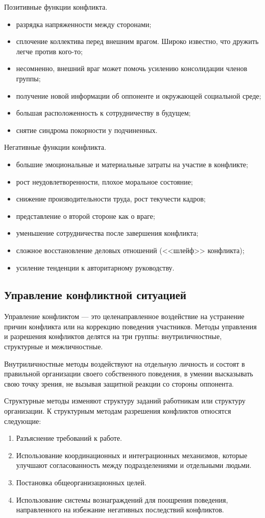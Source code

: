 \documentclass[a4paper,12pt,oneside,final]{extarticle}
\numberwithin{equation}{section}
\begin{document}
Позитивные функции конфликта.
\begin{itemize}
	\item разрядка напряженности между сторонами;
	\item сплочение коллектива перед внешним врагом. Широко известно, что дружить легче против кого-то;
	\item несомненно, внешний враг может помочь усилению консолидации членов группы;
	\item получение новой информации об оппоненте и окружающей социальной среде;
	\item большая расположенность к сотрудничеству в будущем;
	\item снятие синдрома покорности у подчиненных.
\end{itemize}

Негативные функции конфликта.
\begin{itemize}
	\item большие эмоциональные и материальные затраты на участие в конфликте;
	\item рост неудовлетворенности, плохое моральное состояние;
	\item снижение производительности труда, рост текучести кадров;
	\item представление о второй стороне как о враге;
	\item уменьшение сотрудничества после завершения конфликта;
	\item сложное восстановление деловых отношений (<<шлейф>> конфликта);
	\item усиление тенденции к авторитарному руководству.
\end{itemize}

\subsection{Управление конфликтной ситуацией}
Управление конфликтом --- это целенаправленное воздействие на устранение причин конфликта или на коррекцию поведения участников. 
Методы управления и разрешения конфликтов делятся на три группы: внутриличностные, структурные и межличностные.

Внутриличностные методы воздействуют на отдельную личность и состоят в правильной организации своего собственного поведения, в умении высказывать свою точку зрения, не вызывая защитной реакции со стороны оппонента.

Структурные методы изменяют структуру заданий работникам или структуру организации. К структурным методам разрешения конфликтов относятся следующие:
\begin{enumerate}
	\item Разъяснение требований к работе. 
	\item Использование координационных и интеграционных механизмов, которые улучшают согласованность между подразделениями и отдельными людьми.
	\item Постановка общеорганизационных целей.
	\item Использование системы вознаграждений для поощрения поведения, направленного на избежание негативных последствий конфликтов.
\end{enumerate}
\end{document}
